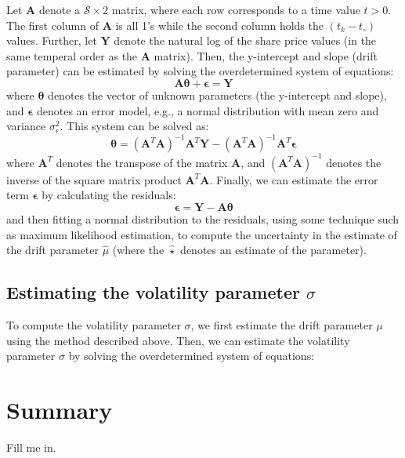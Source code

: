 \documentclass[11pt]{article}
\theoremstyle{definition}
\begin{document}
Let $\mathbf{A}$ denote a $\mathcal{S}\times{2}$ matrix, where each row corresponds to a time value $t>0$. 
The first column of $\mathbf{A}$ is all 1's while the second column holds the $(t_{k}-t_{\circ})$ values. 
Further, let $\mathbf{Y}$ denote the natural log of the share price values (in the same temperal order as the $\mathbf{A}$ matrix). 
Then, the y-intercept and slope (drift parameter) can be estimated by solving the overdetermined system of equations:
\begin{equation*}
\mathbf{A}\mathbf{\theta} + \mathbf{\epsilon} = \mathbf{Y}
\end{equation*}
where $\mathbf{\theta}$ denotes the vector of unknown parameters (the y-intercept and slope), and $\mathbf{\epsilon}$ denotes an error model, e.g., a normal distribution with mean zero and variance $\sigma_{\epsilon}^{2}$.
This system can be solved as:
\begin{equation*}
\mathbf{\theta} = (\mathbf{A}^{T}\mathbf{A})^{-1}\mathbf{A}^{T}\mathbf{Y} - (\mathbf{A}^{T}\mathbf{A})^{-1}\mathbf{A}^{T}\mathbf{\epsilon}
\end{equation*}
where $\mathbf{A}^{T}$ denotes the transpose of the matrix $\mathbf{A}$, and $(\mathbf{A}^{T}\mathbf{A})^{-1}$ denotes the inverse of the square matrix product $\mathbf{A}^{T}\mathbf{A}$. 
Finally, we can estimate the error term $\mathbf{\epsilon}$ by calculating the residuals:
\begin{equation*}
\mathbf{\epsilon} = \mathbf{Y} - \mathbf{A}\mathbf{\theta}
\end{equation*}
and then fitting a normal distribution to the residuals, using some technique such as maximum likelihood estimation, to compute the uncertainty in the estimate of the drift parameter $\hat{\mu}$ 
(where the $\hat{\star}$ denotes an estimate of the parameter).

\subsection*{Estimating the volatility parameter $\sigma$}
To compute the volatility parameter $\sigma$, we first estimate the drift parameter $\mu$ using the method described above.
Then, we can estimate the volatility parameter $\sigma$ by solving the overdetermined system of equations:

\section*{Summary}
Fill me in.



\clearpage
\printindex
\end{document}
